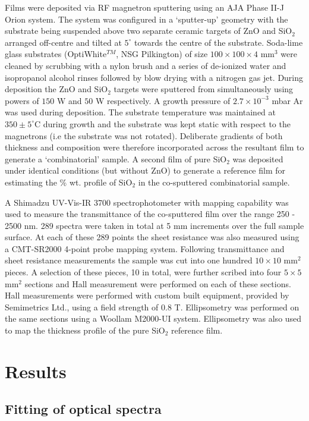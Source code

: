 \documentclass[final,5p,times]{elsarticle}
\begin{document}
Films were deposited via RF magnetron sputtering using an AJA Phase II-J Orion system. The system was configured in a `sputter-up' geometry with the substrate being suspended above two separate ceramic targets of ZnO and SiO$_2$ arranged off-centre and tilted at $5^{\circ}$ towards the centre of the substrate.  Soda-lime glass substrates (OptiWhite$^{TM}$, NSG Pilkington) of size $100\times100\times4$ mm$^{3}$ were cleaned by scrubbing with a nylon brush and a series of de-ionized water and isopropanol alcohol rinses followed by blow drying with a nitrogen gas jet. During deposition the ZnO and SiO$_2$ targets were sputtered from simultaneously using powers of $150$ W and $50$ W respectively. A growth pressure of $2.7\times10^{-3}$ mbar Ar was used during deposition. The substrate temperature was maintained at $350\pm5^{\circ}$C during growth and the substrate was kept static with respect to the magnetrons (i.e the substrate was not rotated). Deliberate gradients of both thickness and composition were therefore incorporated across the resultant film to generate a `combinatorial' sample. A second film of pure SiO$_{2}$ was deposited under identical conditions (but without ZnO) to generate a reference film for estimating the \% wt. profile of SiO$_{2}$ in the co-sputtered combinatorial sample.

A Shimadzu UV-Vis-IR 3700 spectrophotometer with mapping capability was used to measure the transmittance of the co-sputtered film over the range 250 - 2500 nm. 289 spectra were taken in total at 5 mm increments over the full sample surface. At each of these 289 points the sheet resistance was also measured using a CMT-SR2000 4-point probe mapping system. Following transmittance and sheet resistance measurements the sample was cut into one hundred $10\times10$ mm$^2$ pieces. A selection of these pieces, 10 in total, were further scribed into four $5\times5$ mm$^2$ sections and Hall measurement were performed on each of these sections. Hall measurements were performed with custom built equipment, provided by Semimetrics Ltd., using a field strength of 0.8 T.  Ellipsometry was performed on the same sections using a Woollam M2000-UI system. Ellipsometry was also used to map the thickness profile of the pure SiO$_{2}$ reference film.

\section{Results}\label{sec:2}

\subsection{Fitting of optical spectra}\label{sec:2.1}
\end{document}
